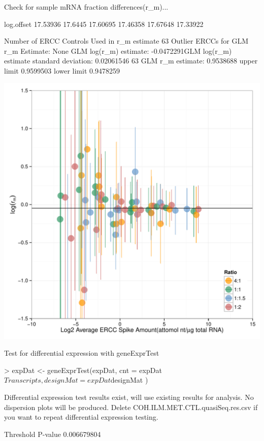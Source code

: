 \documentclass{article}
\begin{document}
\begin{center}
\begin{Schunk}
\begin{Soutput}
Check for sample mRNA fraction differences(r_m)...

log.offset
17.53936 17.6445 17.60695 17.46358 17.67648 17.33922 

Number of ERCC Controls Used in r_m estimate
63 
Outlier ERCCs for GLM r_m Estimate:
None 
 GLM log(r_m) estimate:
-0.0472291GLM log(r_m) estimate standard deviation:
0.02061546 
63 
 GLM r_m estimate:
0.9538688 
upper limit
0.9599503 
lower limit
0.9478259 
\end{Soutput}
\end{Schunk}
\includegraphics{erccdashboardVignette-est_r_m}
\end{center}
Test for differential expression with geneExprTest
\begin{center}
\begin{Schunk}
\begin{Sinput}
> expDat <- geneExprTest(expDat, cnt = expDat$Transcripts,
                         designMat = expDat$designMat )
\end{Sinput}
\begin{Soutput}
 Differential expression test results exist, will use   
 existing results for analysis. No dispersion plots will
 be produced. Delete COH.ILM.MET.CTL.quasiSeq.res.csv if  
 you want to repeat differential expression testing.    

Threshold P-value
0.006679804 
\end{Soutput}
\end{Schunk}
\end{center}
\end{document}
